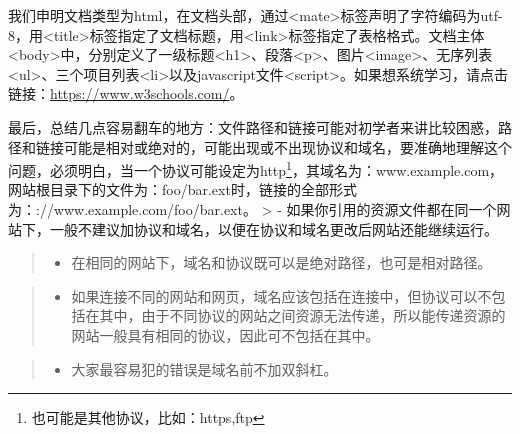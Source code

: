 \documentclass[
]{article}
\providecommand{\tightlist}{%
  \setlength{\itemsep}{0pt}\setlength{\parskip}{0pt}}
\begin{document}
我们申明文档类型为html，在文档头部，通过\textless mate\textgreater 标签声明了字符编码为utf-8，用\textless title\textgreater 标签指定了文档标题，用\textless link\textgreater 标签指定了表格格式。文档主体\textless body\textgreater 中，分别定义了一级标题\textless h1\textgreater、段落\textless p\textgreater、图片\textless image\textgreater、无序列表\textless ul\textgreater、三个项目列表\textless li\textgreater 以及javascript文件\textless script\textgreater。如果想系统学习，请点击链接：\url{https://www.w3schools.com/}。

最后，总结几点容易翻车的地方：文件路径和链接可能对初学者来讲比较困惑，路径和链接可能是相对或绝对的，可能出现或不出现协议和域名，要准确地理解这个问题，必须明白，当一个协议可能设定为http\footnote{也可能是其他协议，比如：https,ftp}，其域名为：www.example.com，网站根目录下的文件为：foo/bar.ext时，链接的全部形式为：\http://www.example.com/foo/bar.ext。
\textgreater{} -
如果你引用的资源文件都在同一个网站下，一般不建议加协议和域名，以便在协议和域名更改后网站还能继续运行。

\begin{quote}
\begin{itemize}
\tightlist
\item
  在相同的网站下，域名和协议既可以是绝对路径，也可是相对路径。
\end{itemize}
\end{quote}

\begin{quote}
\begin{itemize}
\tightlist
\item
  如果连接不同的网站和网页，域名应该包括在连接中，但协议可以不包括在其中，由于不同协议的网站之间资源无法传递，所以能传递资源的网站一般具有相同的协议，因此可不包括在其中。
\end{itemize}
\end{quote}

\begin{quote}
\begin{itemize}
\tightlist
\item
  大家最容易犯的错误是域名前不加双斜杠。
\end{itemize}
\end{quote}
\end{document}
